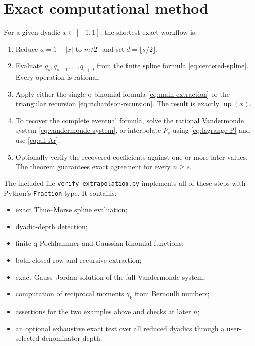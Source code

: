 \documentclass[11pt]{article}
\newcommand{\upf}{\operatorname{up}}
\begin{document}
\section{Exact computational method}

For a given dyadic $x\in[-1,1]$, the shortest exact workflow is:

\begin{enumerate}
 \item Reduce $a=1-|x|$ to $m/2^s$ and set $d=\lfloor s/2\rfloor$.
 \item Evaluate $q_s,q_{s+1},\ldots,q_{s+d}$ from the finite spline formula
       \eqref{eq:centered-spline}.  Every operation is rational.
 \item Apply either the single q-binomial formula
       \eqref{eq:main-extraction} or the triangular recursion
       \eqref{eq:richardson-recursion}.  The result is exactly $\upf(x)$.
 \item To recover the complete eventual formula, solve the rational
       Vandermonde system \eqref{eq:vandermonde-system}, or interpolate
       $P_s$ using \eqref{eq:lagrange-P} and use \eqref{eq:all-Ar}.
 \item Optionally verify the recovered coefficients against one or more later
       values.  The theorem guarantees exact agreement for every $n\ge s$.
\end{enumerate}

The included file \texttt{verify\_extrapolation.py} implements all of these
steps with Python's \texttt{Fraction} type.  It contains:

\begin{itemize}
 \item exact Thue--Morse spline evaluation;
 \item dyadic-depth detection;
 \item finite q-Pochhammer and Gaussian-binomial functions;
 \item both closed-row and recursive extraction;
 \item exact Gauss--Jordan solution of the full Vandermonde system;
 \item computation of reciprocal moments $\gamma_k$ from Bernoulli numbers;
 \item assertions for the two examples above and checks at later $n$;
 \item an optional exhaustive exact test over all reduced dyadics through a
       user-selected denominator depth.
\end{itemize}
\end{document}
